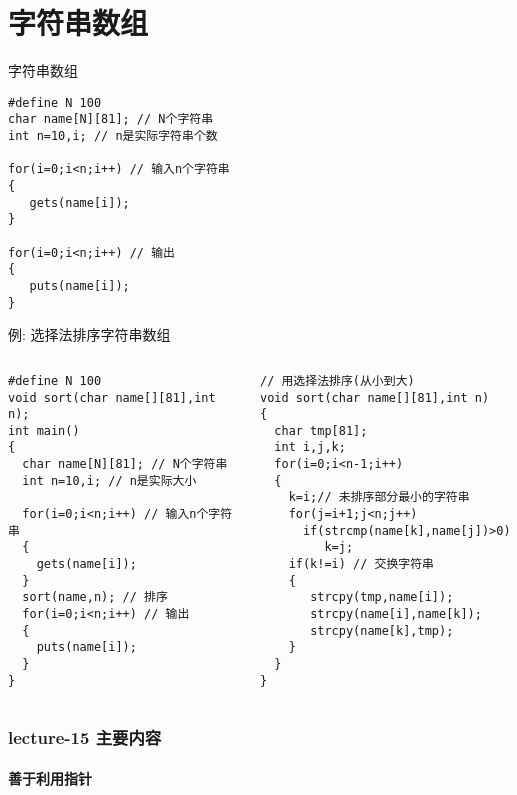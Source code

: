 \section{字符串数组}

\begin{frame}{字符串数组}
\begin{lstlisting}
#define N 100
char name[N][81]; // N个字符串
int n=10,i; // n是实际字符串个数

for(i=0;i<n;i++) // 输入n个字符串
{
   gets(name[i]); 
}

for(i=0;i<n;i++) // 输出
{
   puts(name[i]);
}
\end{lstlisting}
\end{frame}

\begin{frame}{例: 选择法排序字符串数组}
\begin{columns}[T]
\begin{lstlisting}
#define N 100
void sort(char name[][81],int n);
int main()
{
  char name[N][81]; // N个字符串
  int n=10,i; // n是实际大小

  for(i=0;i<n;i++) // 输入n个字符串
  {
    gets(name[i]); 
  }
  sort(name,n); // 排序
  for(i=0;i<n;i++) // 输出
  {
    puts(name[i]); 
  }
}
\end{lstlisting}
\begin{lstlisting}
// 用选择法排序(从小到大)
void sort(char name[][81],int n)
{
  char tmp[81];
  int i,j,k;
  for(i=0;i<n-1;i++)
  {
    k=i;// 未排序部分最小的字符串
    for(j=i+1;j<n;j++)
      if(strcmp(name[k],name[j])>0) 
         k=j;
    if(k!=i) // 交换字符串
    {
       strcpy(tmp,name[i]); 
       strcpy(name[i],name[k]); 
       strcpy(name[k],tmp);
    }
  }
}
\end{lstlisting}
\end{columns}
\medskip
\end{frame}

\begin{frame}[shrink]
\frametitle{lecture-15 主要内容}
\framesubtitle{善于利用指针}
\tableofcontents
\end{frame}





